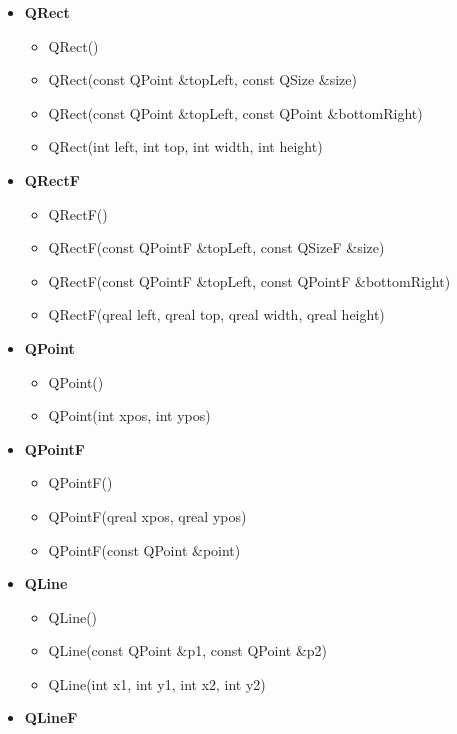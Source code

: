 \documentclass{report}
\begin{document}
    \begin{itemize}
    \item \textbf{QRect}
        \begin{itemize}
            \item QRect()
            \item QRect(const QPoint \&topLeft, const QSize \&size)
            \item QRect(const QPoint \&topLeft, const QPoint \&bottomRight)
            \item QRect(int left, int top, int width, int height)
        \end{itemize}
    \item \textbf{QRectF}
        \begin{itemize}
            \item QRectF()
            \item QRectF(const QPointF \&topLeft, const QSizeF \&size)
            \item QRectF(const QPointF \&topLeft, const QPointF \&bottomRight)
            \item QRectF(qreal left, qreal top, qreal width, qreal height)
        \end{itemize}
    \item \textbf{QPoint}
        \begin{itemize}
            \item QPoint()
            \item QPoint(int xpos, int ypos)
        \end{itemize}
    \item \textbf{QPointF}
        \begin{itemize}
            \item QPointF()
            \item QPointF(qreal xpos, qreal ypos)
            \item QPointF(const QPoint \&point)
        \end{itemize}
    \item \textbf{QLine}
        \begin{itemize}
            \item QLine()
            \item QLine(const QPoint \&p1, const QPoint \&p2)
            \item QLine(int x1, int y1, int x2, int y2)
        \end{itemize}
    \item \textbf{QLineF}
        \begin{itemize}

\end{itemize}
\end{itemize}
\end{document}
